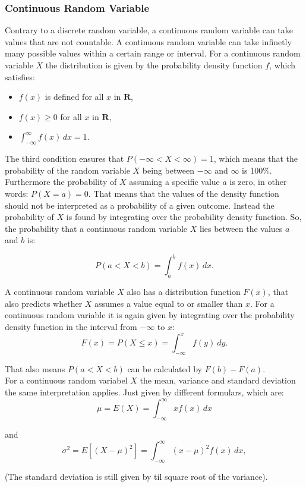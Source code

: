 \subsubsection{Continuous Random Variable}
Contrary to a discrete random variable, a continuous random variable can take values that are not countable. A continuous random variable can take infinetly many possible values within a certain range or interval. For a continuous random variable $X$ the distribution is given by the probability density function $f$, which satisfies:

\begin{itemize}
	\item $f(x)$ is defined for all $x$ in $\textbf{R}$,
	\item $f(x) \geq 0$ for all $x$ in $\textbf{R}$,
	\item $\int_{-\infty}^{\infty} f(x) \, dx = 1.$
\end{itemize}

\noindent The third condition ensures that $P(-\infty < X < \infty) = 1$, which means that the probability of the random variable $X$ being between $-\infty$ and $\infty$ is 100\%. Furthermore the probability of $X$ assuming a specific value $a$ is zero, in other words: $P(X=a)=0$. That means that the values of the density function should not be interpreted as a probability of a given outcome. Instead the probability of $X$ is found by integrating over the probability density function. So, the probability that a continuous random variable $X$ lies between the values $a$ and $b$ is: 

\begin{equation}
P(a < X < b) = \int_a^b f(x) \, dx.
\end{equation}


\noindent A continuous random variable $X$ also has a distribution function $F(x)$, that also predicts whether $X$ assumes a value equal to or smaller than $x$. For a continuous random variable it is again given by integrating over the probability density function in the interval from $-\infty$ to $x$:
\begin{equation}
F(x) = P(X \leq x) = \int_{-\infty}^{x} f(y) \ dy.
\end{equation}


\noindent That also means $P(a<X<b)$ can be calculated by $F(b)-F(a)$.
\\

\noindent For a continuous random variabel $X$ the mean, variance and standard deviation the same interpretation applies. Just given by different formulars, which are:
\begin{equation}
	\mu = E(X) = \int_{-\infty}^{\infty} x f(x) \, dx
\end{equation}

\noindent and
\begin{equation}
\sigma^2 = E\left[(X - \mu)^2\right] = \int_{-\infty}^{\infty} (x - \mu)^2 f(x) \, dx,
\end{equation}

\noindent (The standard deviation is still given by til square root of the variance).

